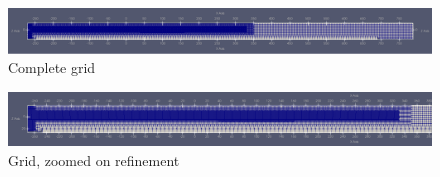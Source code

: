 
\begin{figure}[H]
    \centering
    \includegraphics[width=\linewidth]{figures/Validation/grid_naked.png}
    \caption{Complete grid}
    \label{fig:complete grid}
\end{figure}
\begin{figure}[H]
    \centering
    \includegraphics[width=\linewidth]{figures/Validation/grid_zoomed.png}
    \caption{Grid, zoomed on refinement}
    \label{fig:zoomed grid}
\end{figure}


